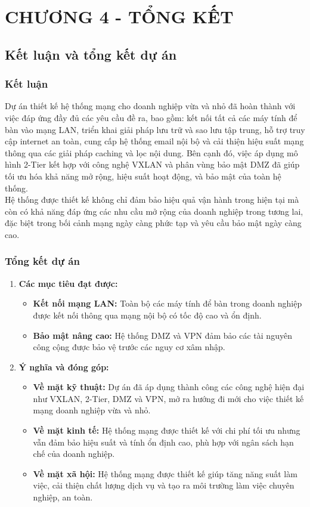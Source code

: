 \documentclass[13pt]{article}
\begin{document}
\section*{CHƯƠNG 4 - TỔNG KẾT}
\subsection{Kết luận và tổng kết dự án}
\subsubsection{Kết luận}

Dự án thiết kế hệ thống mạng cho doanh nghiệp vừa và nhỏ đã hoàn thành với việc đáp ứng đầy đủ các yêu cầu đề ra, bao gồm: kết nối tất cả các máy tính để bàn vào mạng LAN, triển khai giải pháp lưu trữ và sao lưu tập trung, hỗ trợ truy cập internet an toàn, cung cấp hệ thống email nội bộ và cải thiện hiệu suất mạng thông qua các giải pháp caching và lọc nội dung. Bên cạnh đó, việc áp dụng mô hình 2-Tier kết hợp với công nghệ VXLAN và phân vùng bảo mật DMZ đã giúp tối ưu hóa khả năng mở rộng, hiệu suất hoạt động, và bảo mật của toàn hệ thống.\\

Hệ thống được thiết kế không chỉ đảm bảo hiệu quả vận hành trong hiện tại mà còn có khả năng đáp ứng các nhu cầu mở rộng của doanh nghiệp trong tương lai, đặc biệt trong bối cảnh mạng ngày càng phức tạp và yêu cầu bảo mật ngày càng cao.

\subsubsection{Tổng kết dự án}
\begin{enumerate}
    \item \textbf{Các mục tiêu đạt được:}
    \begin{itemize}
        \item \textbf{Kết nối mạng LAN: }Toàn bộ các máy tính để bàn trong doanh nghiệp được kết nối thông qua mạng nội bộ có tốc độ cao và ổn định.
        \item \textbf{Bảo mật nâng cao: } Hệ thống DMZ và VPN đảm bảo các tài nguyên công cộng được bảo vệ trước các nguy cơ xâm nhập.
    \end{itemize}
    \item \textbf{Ý nghĩa và đóng góp:}
    \begin{itemize}
        \item \textbf{Về mặt kỹ thuật: }Dự án đã áp dụng thành công các công nghệ hiện đại như VXLAN, 2-Tier, DMZ và VPN, mở ra hướng đi mới cho việc thiết kế mạng doanh nghiệp vừa và nhỏ.
        \item \textbf{Về mặt kinh tế: }Hệ thống mạng được thiết kế với chi phí tối ưu nhưng vẫn đảm bảo hiệu suất và tính ổn định cao, phù hợp với ngân sách hạn chế của doanh nghiệp.
        \item \textbf{Về mặt xã hội: }Hệ thống mạng được thiết kế giúp tăng năng suất làm việc, cải thiện chất lượng dịch vụ và tạo ra môi trường làm việc chuyên nghiệp, an toàn.
    \end{itemize}
\end{enumerate}
\end{document}

